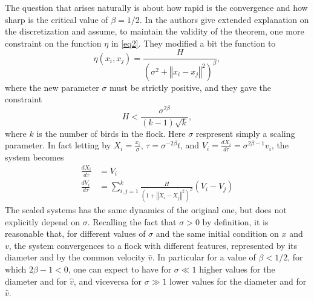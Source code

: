 \documentclass{article} %
\begin{document}
The question that
arises naturally is about how rapid is the convergence and how sharp is the critical value of $\beta=1/2$.
In \cite{CuckerSmale1} the authors give extended explanation on the 
discretization and assume, to maintain the validity of the theorem, one more constraint on
the function $\eta$ in \eqref{eq2}. They modified a bit the function to 
\begin{equation}
	\label{eq9}
	\eta(x_i,x_j)=\frac{H}{(\sigma^2+\left\Vert x_i - x_j \right\Vert^2)^{\beta}},
\end{equation}
where the new parameter $\sigma$ must be strictly positive, and they gave the constraint
\begin{equation}
	\label{eq10}
	H<\frac{\sigma^{2\beta}}{(k-1)\sqrt{k}},
\end{equation}
where $k$ is the number of birds in the flock.
Here $\sigma$ respresent simply a scaling parameter. In fact letting by $X_i=\frac{x_i}{\sigma}$,
$\tau=\sigma^{-2\beta}t$, and $V_i=\frac{dX_i}{d\tau}=\sigma^{2\beta-1}v_i$,  the system becomes
\begin{align}
\label{eq11}
    \frac{dX_i}{d\tau} &= V_i\\
    \frac{dV_i}{d\tau} &= \sum_{i,j=1}^k\frac{H}{(1+\left\Vert X_i - X_j \right\Vert^2)^{\beta}}(V_i - V_j)\nonumber
\end{align}
The scaled systems has the same dynamics of the original one, but does not explicitly depend on $\sigma$.
Recalling the fact that $\sigma>0$ by definition, it is reasonable that, for different values of $\sigma$
and the same initial condition on $x$ and $v$, the system convergences to a flock with different features,
represented by its diameter and by the common velocity $\widehat{v}$. In particular for a value of $\beta<1/2$,
for which $2\beta-1<0$, one can expect to have for $\sigma\ll1$ higher values for the diameter and for $\widehat{v}$,
and viceversa for $\sigma\gg1$ lower values for the diameter and for $\widehat{v}$.


\end{document}
